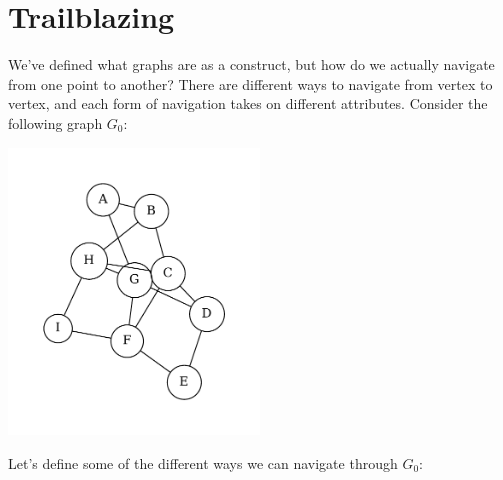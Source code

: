 \section{Trailblazing}
We've defined what graphs are as a construct, but how do we actually navigate from one point to another? There are different ways to navigate from vertex to vertex, and each form of navigation takes on different attributes. Consider the following graph $G_0$:
\begin{center}
    \includegraphics[width=0.5\textwidth]{Chapter2/nav.pdf}
\end{center}
Let's define some of the different ways we can navigate through $G_0$:
